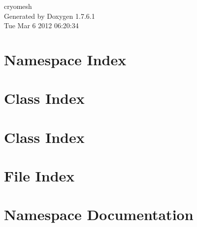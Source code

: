 \documentclass[a4paper]{book}
\begin{document}
\hypersetup{pageanchor=false,citecolor=blue}
\begin{titlepage}
\vspace*{7cm}
\begin{center}
{\Large cryomesh }\\
\vspace*{1cm}
{\large \-Generated by Doxygen 1.7.6.1}\\
\vspace*{0.5cm}
{\small Tue Mar 6 2012 06:20:34}\\
\end{center}
\end{titlepage}
\clearemptydoublepage
{}
\tableofcontents
\clearemptydoublepage
{}
\hypersetup{pageanchor=true,citecolor=blue}
\chapter{\-Namespace \-Index}

\chapter{\-Class \-Index}

\chapter{\-Class \-Index}

\chapter{\-File \-Index}

\chapter{\-Namespace \-Documentation}









\end{document}
